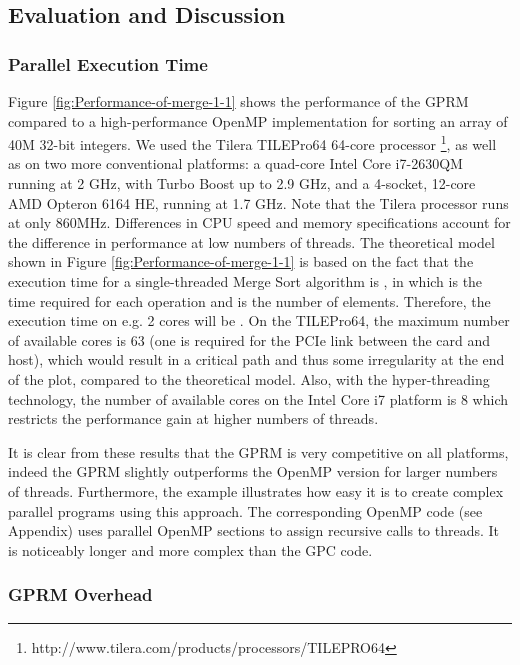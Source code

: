 \documentclass[copyright,creativecommons]{eptcs}
\begin{document}
\subsection{Evaluation and Discussion}


\subsubsection{Parallel Execution Time }

Figure \ref{fig:Performance-of-merge-1-1} shows the performance of
the GPRM compared to a high-performance OpenMP implementation \cite{radenskishared}
for sorting an array of 40M 32-bit integers. We used the Tilera TILEPro64
64-core processor \footnote{http://www.tilera.com/products/processors/TILEPRO64},
as well as on two more conventional platforms: a quad-core Intel Core
i7-2630QM running at 2 GHz, with Turbo Boost up to 2.9 GHz, and a
4-socket, 12-core AMD Opteron 6164 HE, running at 1.7 GHz. Note that
the Tilera processor runs at only 860MHz. Differences in CPU speed
and memory specifications account for the difference in performance
at low numbers of threads. The theoretical model shown in Figure \ref{fig:Performance-of-merge-1-1}
is based on the fact that the execution time for a single-threaded
Merge Sort algorithm is , in which  is the time required
for each operation and  is the number of elements. Therefore,
the execution time on e.g. 2 cores will be .
On the TILEPro64, the maximum number of available cores is 63 (one
is required for the PCIe link between the card and host), which would
result in a critical path and thus some irregularity at the end of
the plot, compared to the theoretical model. Also, with the hyper-threading
technology, the number of available cores on the Intel Core i7 platform
is 8 which restricts the performance gain at higher numbers of threads. 

It is clear from these results that the GPRM is very competitive on
all platforms, indeed the GPRM slightly outperforms the OpenMP version
for larger numbers of threads. Furthermore, the example illustrates
how easy it is to create complex parallel programs using this approach.
The corresponding OpenMP code (see Appendix) uses parallel OpenMP
sections to assign recursive calls to threads. It is noticeably longer
and more complex than the GPC code.


\subsubsection{GPRM Overhead}
\end{document}
